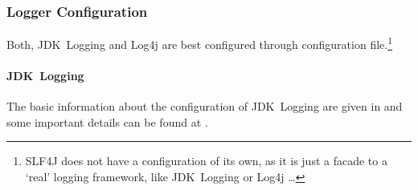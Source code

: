 \documentclass[11pt,a4paper, titlepage, parskip=half, headsepline, footsepline, cleardoublepage=current, headheight=1cm]{scrbook}
\begin{document}
\subsubsection{Logger Configuration}\label{sec:LoggerConfiguration}
Both, JDK~Logging and Log4j are best configured through configuration file.\footnote{SLF4J does not have a configuration of its own, as it is just a facade to a ‘real’ logging framework, like JDK~Logging or Log4j …}

\paragraph{JDK~Logging} The basic information about the configuration of JDK~Logging are given in \autocite{ORACLE_DOC_LOGGING_OVERVIEW:ConfigurationFile, ORACLE_DOC_LOGGING_OVERVIEW:DefaultConfiguration} and some important details can be found at \autocite{ORACLE_DOC_LOGMANAGER_CLASS}.
\end{document}
